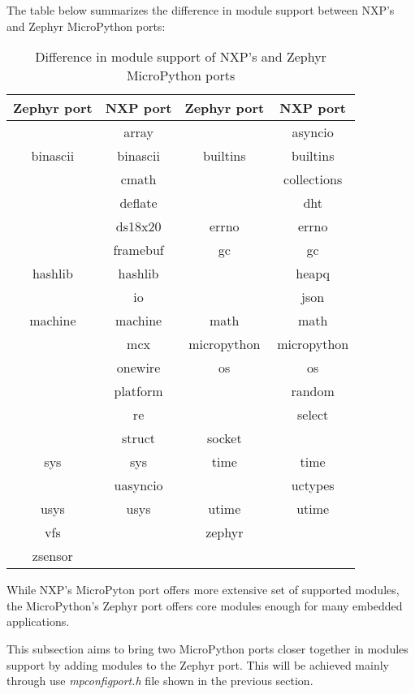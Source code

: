 \documentclass[twoside, 12pt]{article}
\begin{document}
The table below summarizes the difference in module support between NXP's and Zephyr MicroPython ports:

\begin{table}[H]
\centering
\caption{Difference in module support of NXP's and Zephyr MicroPython ports}
\label{tab:micropython-modules}
\renewcommand{\arraystretch}{1.2}
\begin{tabular}{|c|c||c|c|} \hline
\textbf{Zephyr port} & \textbf{NXP port} & \textbf{Zephyr port} & \textbf{NXP port} \\ \hline
 & array &  & asyncio \\ \hline
binascii & binascii & builtins & builtins \\ \hline
 & cmath &  & collections \\ \hline
 & deflate & & dht \\ \hline
& ds18x20 & errno & errno \\ \hline
 & framebuf & gc & gc \\ \hline
hashlib & hashlib &  & heapq \\ \hline
 & io &  & json \\ \hline
machine & machine & math & math \\ \hline
& mcx & micropython & micropython \\ \hline
& onewire & os & os \\ \hline
 & platform &  & random \\ \hline
 & re &  & select \\ \hline
 & struct & socket & \\ \hline
sys & sys & time & time \\ \hline
& uasyncio &  & uctypes \\ \hline
usys & usys & utime & utime \\ \hline
vfs & & zephyr & \\ \hline
zsensor & & & \\ \hline
\end{tabular}
\end{table}

While NXP's MicroPyton port offers more extensive set of supported modules, the MicroPython's 
Zephyr port offers core modules enough for many embedded applications.

This subsection aims to bring two MicroPython ports closer together in modules support by 
adding modules to the Zephyr port. This will be achieved mainly through use 
\textit{mpconfigport.h} file shown in the previous section.
\end{document}
